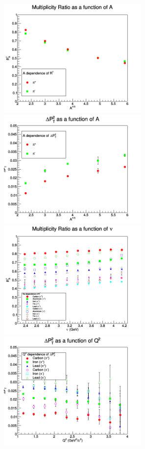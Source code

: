 \begin{figure}[p]
\centering
\includegraphics[width=7.4cm] {new-fig/40_Adep_Ratio_A13_0.png} 
\includegraphics[width=7.4cm] {new-fig/44_Adep_DePts_A13_0.png} 
\includegraphics[width=7.4cm] {new-fig/41_Ndep_Ratio_Nu_0.png} 
\includegraphics[width=7.4cm] {new-fig/46_Qdep_DePts_Q2_0.png} 

\end{figure}
